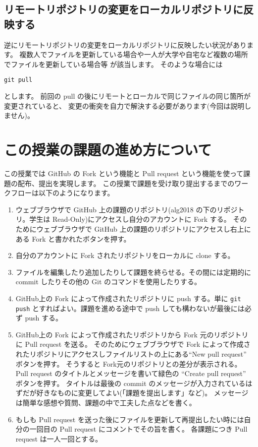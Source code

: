 \documentclass[a4paper,11pt, article]{memoir}
\begin{document}
\subsection{リモートリポジトリの変更をローカルリポジトリに反映する}
逆にリモートリポジトリの変更をローカルリポジトリに反映したい状況があります。
複数人でファイルを更新している場合や一人が大学や自宅など複数の場所でファイルを更新している場合等
が該当します。
そのような場合には
\begin{verbatim}
git pull
\end{verbatim}
とします。
前回の pull の後にリモートとローカルで同じファイルの同じ箇所が変更されていると、
変更の衝突を自力で解決する必要があります(今回は説明しません)。

\section{この授業の課題の進め方について}
この授業では GitHub の Fork という機能と Pull request という機能を使って課題の配布、提出を実現します。
この授業で課題を受け取り提出するまでのワークフローは以下のようになります。
\begin{enumerate}
\item ウェブブラウザで GitHub 上の課題のリポジトリ(alg2018 の下のリポジトリ。学生は Read-Only)にアクセスし自分のアカウントに Fork する。
そのためにウェブブラウザで GitHub 上の課題のリポジトリにアクセスし右上にある Fork と書かれたボタンを押す。
\item 自分のアカウントに Fork されたリポジトリをローカルに clone する。
\item ファイルを編集したり追加したりして課題を終らせる。その間には定期的に commit したりその他の Git のコマンドを使用したりする。
\item GitHub上の Fork によって作成されたリポジトリに push する。単に \texttt{git push} とすればよい。課題を進める途中で push しても構わないが最後には必ず push する。
\item GitHub上の Fork によって作成されたリポジトリから Fork 元のリポジトリに Pull request を送る。
そのためにウェブブラウザで Fork によって作成されたリポジトリにアクセスしファイルリストの上にある``New pull request'' ボタンを押す。
そうすると Fork元のリポジトリとの差分が表示される。
Pull request のタイトルとメッセージを書いて緑色の ``Create pull request'' ボタンを押す。
タイトルは最後の commit のメッセージが入力されているはずだが好きなものに変更してよい(「課題を提出します」など)。
メッセージは簡単な感想や質問、課題の中で工夫した点などを書く。
\item もしも Pull request を送った後にファイルを更新して再提出したい時には自分の一回目の Pull request にコメントでその旨を書く。
各課題につき Pull request は一人一回とする。
\end{enumerate}
\end{document}
